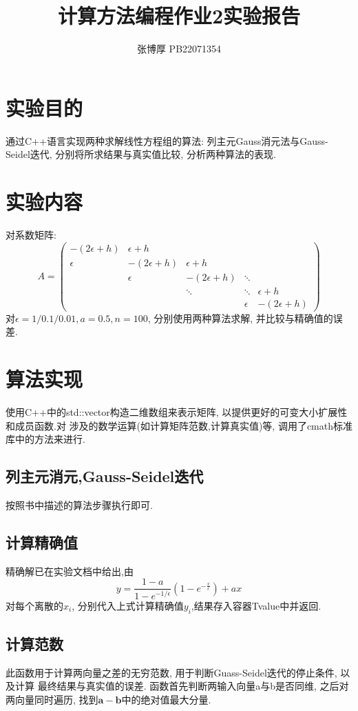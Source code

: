 \documentclass[12pt,a4paper,oneside]{article}
\title{计算方法编程作业2实验报告}
\author{张博厚 PB22071354}
\date{}
\begin{document}
\maketitle
\tableofcontents
\newpage
\section{实验目的}
通过C++语言实现两种求解线性方程组的算法: 列主元Gauss消元法与Gauss-Seidel迭代,
分别将所求结果与真实值比较, 分析两种算法的表现.
\section{实验内容}
对系数矩阵:
$$
A = 
\begin{pmatrix}
    -(2\epsilon+h) & \epsilon+h & & & \\
    \epsilon & -(2\epsilon+h) & \epsilon+h & & \\
    & \epsilon & -(2\epsilon+h) & \ddots & \\
    &        &   \ddots & \ddots & \epsilon+h \\
    &   &   & \epsilon & -(2\epsilon+h)
\end{pmatrix}
$$
对$\epsilon=1/0.1/0.01, a=0.5, n=100$, 分别使用两种算法求解, 并比较与精确值的误差.
\section{算法实现}
使用C++中的std::vector构造二维数组来表示矩阵, 以提供更好的可变大小扩展性和成员函数.对
涉及的数学运算(如计算矩阵范数,计算真实值)等, 调用了cmath标准库中的方法来进行.
\subsection{列主元消元,Gauss-Seidel迭代}
按照书中描述的算法步骤执行即可.
\subsection{计算精确值}
精确解已在实验文档中给出,由
\begin{equation}
    y = \dfrac{1-a}{1-e^{-1/\epsilon}}(1-e^{-\frac{x}{\epsilon}})+ax
\end{equation}
对每个离散的$x_i$, 分别代入上式计算精确值$y_i$,结果存入容器Tvalue中并返回.

\subsection{计算范数}
此函数用于计算两向量之差的无穷范数, 用于判断Guass-Seidel迭代的停止条件, 以及计算
最终结果与真实值的误差.
函数首先判断两输入向量a与b是否同维, 之后对两向量同时遍历, 找到$\mathbf{a}-\mathbf{b}
$中的绝对值最大分量.
\end{document}
